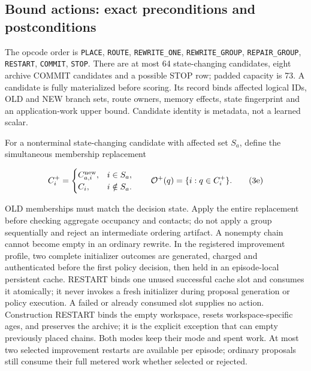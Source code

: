 \documentclass[10pt,a4paper]{article}
\begin{document}
\hypertarget{bound-actions-exact-preconditions-and-postconditions}{%
\subsection{Bound actions: exact preconditions and
postconditions}\label{bound-actions-exact-preconditions-and-postconditions}}

The opcode order is \texttt{PLACE}, \texttt{ROUTE},
\texttt{REWRITE\_ONE}, \texttt{REWRITE\_GROUP}, \texttt{REPAIR\_GROUP},
\texttt{RESTART}, \texttt{COMMIT}, \texttt{STOP}. There are at most 64
state-changing candidates, eight archive COMMIT candidates and a
possible STOP row; padded capacity is 73. A candidate is fully
materialized before scoring. Its record binds affected logical IDs, OLD
and NEW branch sets, route owners, memory effects, state fingerprint and
an application-work upper bound. Candidate identity is metadata, not a
learned scalar.

For a nonterminal state-changing candidate with affected set \(S_a\),
define the simultaneous membership replacement

\[
C_i^+=\begin{cases}C_{a,i}^{\rm new},&i\in S_a,\\ C_i,&i\notin S_a.\end{cases}
\qquad
\mathcal O^+(q)=\{i:q\in C_i^+\}.
\tag{3e}
\]

OLD memberships must match the decision state. Apply the entire
replacement before checking aggregate occupancy and contacts; do not
apply a group sequentially and reject an intermediate ordering artifact.
A nonempty chain cannot become empty in an ordinary rewrite. In the
registered improvement profile, two complete initializer outcomes are
generated, charged and authenticated before the first policy decision,
then held in an episode-local persistent cache. RESTART binds one unused
successful cache slot and consumes it atomically; it never invokes a
fresh initializer during proposal generation or policy execution. A
failed or already consumed slot supplies no action. Construction RESTART
binds the empty workspace, resets workspace-specific ages, and preserves
the archive; it is the explicit exception that can empty previously
placed chains. Both modes keep their mode and spent work. At most two
selected improvement restarts are available per episode; ordinary
proposals still consume their full metered work whether selected or
rejected.

\begingroup\small
\end{document}
